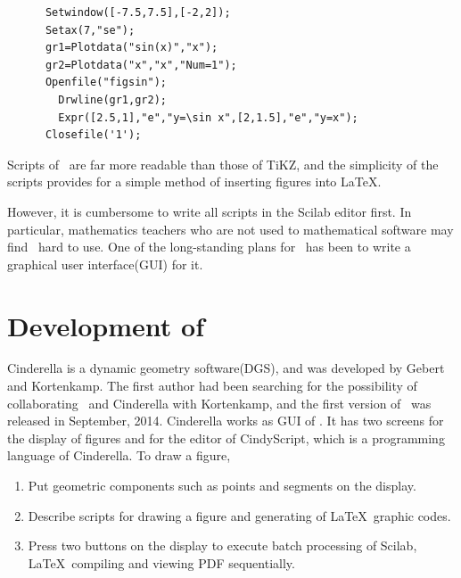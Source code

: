 \documentclass[11pt]{article}
\begin{document}

{\small
\begin{verbatim}
      Setwindow([-7.5,7.5],[-2,2]);
      Setax(7,"se");
      gr1=Plotdata("sin(x)","x");
      gr2=Plotdata("x","x","Num=1");
      Openfile("figsin");
        Drwline(gr1,gr2);
        Expr([2.5,1],"e","y=\sin x",[2,1.5],"e","y=x");
      Closefile('1');
\end{verbatim}
}\vspace{-2mm}

Scripts of \ketpic\ are far more readable than those of TiKZ, and the simplicity
of the scripts provides for a simple method of inserting figures into \LaTeX.

However, it is cumbersome to write all scripts in the Scilab editor first. %
In particular, mathematics teachers who are not used to mathematical software may
find \ketpic\ hard to use.
One of the long-standing plans for \ketpic\ has been to write a graphical user
interface(GUI) for it.

\section{Development of \ketcindy}

Cinderella\cite{cindy} is a dynamic geometry software(DGS), and was developed by
Gebert and Kortenkamp.  The first author had been searching for the possibility
of collaborating \ketpic\ and Cinderella with Kortenkamp, and the first version
of \ketcindy\ was released in September, 2014. Cinderella works as GUI of
\ketcindy. It has two screens for the display of figures and for the editor of
CindyScript, which is a programming language of Cinderella. To draw a figure,\vspace{-2mm}

\begin{enumerate}
\item Put geometric components such as points and segments on the display.\vspace{-2mm}
\item Describe scripts for drawing a figure and generating of \LaTeX\ graphic
  codes.\vspace{-2mm}
\item Press two buttons on the display to execute batch processing of Scilab,
  \LaTeX\ compiling and viewing PDF sequentially.\vspace{-2mm}
\end{enumerate}%
\end{document}
